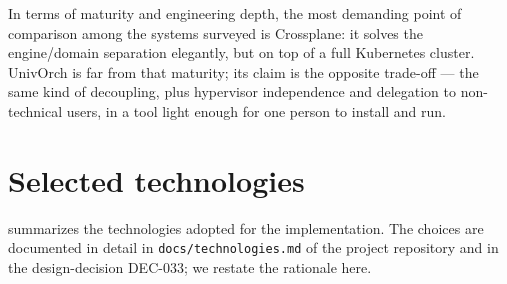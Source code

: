 In terms of maturity and engineering depth, the most demanding point
of comparison among the systems surveyed is Crossplane: it solves the
engine/domain separation elegantly, but on top of a full Kubernetes
cluster. UnivOrch is far from that maturity; its claim is the opposite
trade-off --- the same kind of decoupling, plus hypervisor
independence and delegation to non-technical users, in a tool light
enough for one person to install and run.

\section{Selected technologies}
\label{sec:tecnologias-seleccionadas}

 summarizes the technologies adopted for the
implementation. The choices are documented in detail in
\texttt{docs/technologies.md} of the project repository and in the
design-decision DEC-033; we restate the rationale here.

